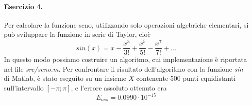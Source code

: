 \paragraph{Esercizio 4.} Per calcolare la funzione seno, utilizzando solo operazioni algebriche elementari, si può sviluppare la funzione in serie di Taylor, cioè
\[
sin(x) = x - \frac{x^3}{3!} + \frac{x^5}{5!} - \frac{x^7}{7!} + \ldots
\]
In questo modo possiamo costruire un algoritmo, cui implementazione è riportata nel file \emph{src/seno.m}. Per confrontare il risultato dell'algoritmo con la funzione \emph{sin} di Matlab, è stato eseguito su un insieme $X$ contenente 500 punti equidistanti sull'intervallo $[-\pi; \pi]$, e l'errore assoluto ottenuto era
\[
E_{ass} = 0.0990 \cdot 10^{-15}
\]